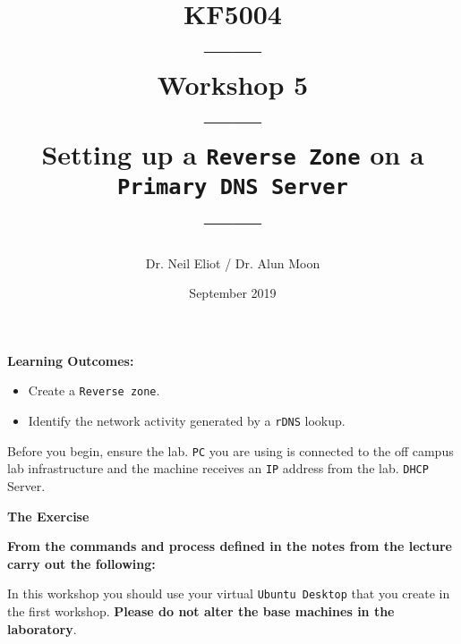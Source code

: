 \documentclass[11pt]{article}
\begin{document}
\author{Dr. Neil Eliot / Dr. Alun Moon}
\title{KF5004\\------\\Workshop 5\\------\\Setting up a \texttt{Reverse Zone} on a \texttt{Primary DNS Server}\\------}
\date{September 2019}
\maketitle

\newpage



\noindent\textbf{Learning Outcomes:}
\begin{itemize}
    \item Create a \texttt{Reverse zone}.
    \item Identify the network activity generated by a \texttt{rDNS} lookup.
\end{itemize}


\begin{tcolorbox}[title={\textbf{Important:}}]
    Before you begin, ensure the lab. \texttt{PC} you are using is connected to the off campus lab infrastructure and the machine receives an \texttt{IP} address from the lab. \texttt{DHCP} Server.
\end{tcolorbox}
\newpage

\noindent\textbf{The Exercise}\\
\begin{tcolorbox}[colback=blue!20]
    \noindent\textbf{From the commands and process defined in the notes from the lecture carry out the following:}
\end{tcolorbox}


\begin{tcolorbox}[title={\textbf{NOTE:}}]
    In this workshop you should use your virtual \texttt{Ubuntu Desktop} that you create in the first workshop. \textbf{Please do not alter the base machines in the laboratory}.
\end{tcolorbox}
\end{document}
